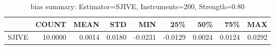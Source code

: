 \begin{table}[ht]
\centering
\caption{bias summary: Estimator=SJIVE, Instruments=200, Strength=0.80}
\begin{tabular}{lrrrrrrrr}
\toprule
 & COUNT & MEAN & STD & MIN & 25\% & 50\% & 75\% & MAX \\
\midrule
SJIVE & 10.0000 & 0.0014 & 0.0180 & -0.0231 & -0.0129 & 0.0024 & 0.0124 & 0.0292 \\
\bottomrule
\end{tabular}
\end{table}
